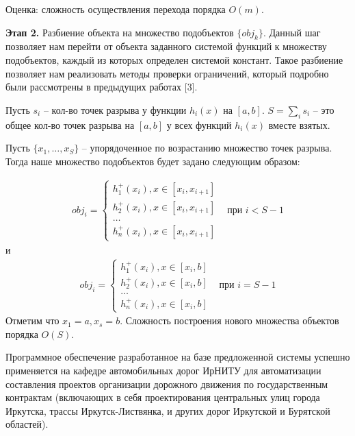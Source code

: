Оценка: сложность осуществления перехода порядка $O(m)$.


\textbf{Этап 2.} Разбиение объекта  на множество подобъектов $\{obj_k\}$.
Данный шаг позволяет нам перейти от объекта заданного системой функций к множеству подобъектов, каждый из которых определен системой констант. Такое разбиение позволяет нам реализовать методы проверки ограничений, который подробно были рассмотрены в предыдущих работах [3]. 

Пусть $s_i$ -- кол-во точек разрыва у функции $h_i(x)$ на $[a, b]$. $S = \sum_{i}s_i$ -- это общее кол-во точек разрыва на $[a,b]$ у всех функций $h_i(x)$ вместе взятых. 

Пусть $\{x_1, \dots, x_S\}$ -- упорядоченное по возрастанию множество точек разрыва. Тогда наше множество подобъектов будет задано следующим образом:
 
$$
\begin{aligned}
	obj_i = 
	\begin{cases}
		h^+_1(x_i), x \in [x_i, x_{i+1}] \\
		h^+_2(x_i), x \in [x_i, x_{i+1}] \\
		\dots \\
		h^+_n(x_i), x \in [x_i, x_{i+1}]
	\end{cases}
\end{aligned}
\begin{aligned}
\text{при } i < S - 1
\end{aligned}
$$
и
$$
\begin{aligned}
	obj_i = 
	\begin{cases}
		h^+_1(x_i), x \in [x_i, b] \\
		h^+_2(x_i), x \in [x_i, b] \\
		\dots \\
		h^+_n(x_i), x \in [x_i, b]
	\end{cases}
\end{aligned}
\begin{aligned}
\text{при } i = S - 1
\end{aligned}
$$
Отметим что $x_1 = a, x_s = b$. Сложность построения нового множества объектов порядка $O(S)$.

Программное обеспечение разработанное на базе предложенной системы успешно применяется на кафедре автомобильных дорог ИрНИТУ для автоматизации составления проектов организации дорожного движения по государственным контрактам (включающих в себя проектирования центральных улиц города Иркутска, трассы Иркутск-Листвянка, и других дорог Иркутской и Бурятской областей).

